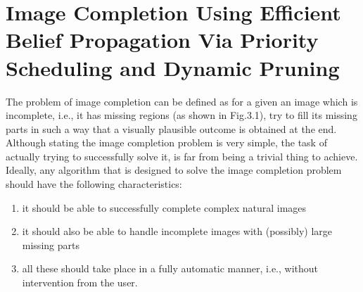 \section{Image Completion Using Efficient Belief Propagation
Via Priority Scheduling and Dynamic Pruning}
The problem of image completion can be defined as for a given an image which is incomplete, i.e., it has
missing regions (as shown in  Fig.3.1), try to fill its missing parts in such a way that a visually plausible outcome is obtained at
the end. Although stating the image completion problem is very simple, the task of actually trying to successfully solve it, is far from being a trivial thing to achieve. Ideally, any algorithm that is designed to solve the image completion problem should have the following characteristics:
\begin{enumerate}
  \item it should be able to successfully complete complex natural
images
  \item it should also be able to handle incomplete images with
(possibly) large missing parts
  \item all these should take place in a fully automatic manner, i.e.,
without intervention from the user.
\end{enumerate}

